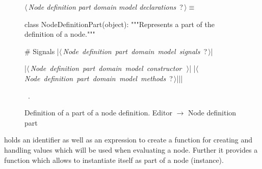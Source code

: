 \documentclass[%
    a4paper,    %
    justified,  %
    nobib,      %
    openany     %
]{tufte-book}
\begin{document}
\begin{figure}
\begin{flushleft} \small
\begin{minipage}{\linewidth}\label{scrap109}\raggedright\small
{} $\langle\,${\itshape Node definition part domain model declarations}\nobreak\ {\footnotesize {?}}$\,\rangle\equiv$
\vspace{-1ex}
\begin{pythoncode}
class NodeDefinitionPart(object):
    """Represents a part of the definition of a node."""

    # Signals
    |\hbox{$\langle\,${\itshape Node definition part domain model signals}\nobreak\ {\footnotesize ?}$\,\rangle$}|

    |\hbox{$\langle\,${\itshape Node definition part domain model constructor}\nobreak\ {\footnotesize {}}$\,\rangle$}|
    |\hbox{$\langle\,${\itshape Node definition part domain model methods}\nobreak\ {\footnotesize ?}$\,\rangle$}||\NWsep|
\end{pythoncode}
\vspace{1.5ex}
\footnotesize
\begin{list}{}{\setlength{\itemsep}{-\parsep}\setlength{\itemindent}{-\leftmargin}}
\item \NWtxtMacroRefIn\ .

\item{}
\end{list}
\end{minipage}\vspace{4ex}
\end{flushleft}
\caption{Definition of a part of a node definition.
  \newline{}\newline{}Editor $\rightarrow$ Node definition part}
\label{editor:lst:node-definition-part}
\end{figure}

 holds an identifier as well as an
expression to create a function for creating and handling values which will be
used when evaluating a node. Further it provides a function which allows to
instantiate itself as part of a node (instance).
\end{document}
